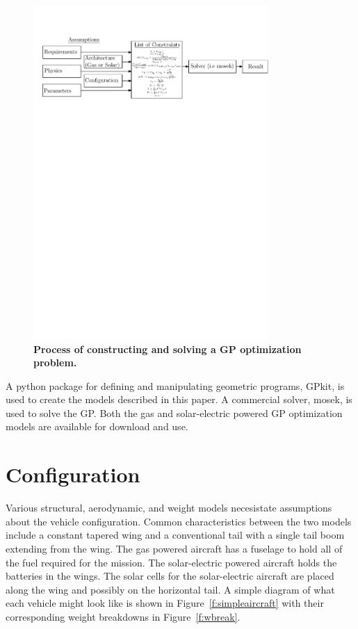 \begin{figure}[H]
	\begin{center}
	\includegraphics[width=0.8\textwidth,natwidth=480,natheight=200]{flowchart.pdf}
    \caption{\textbf{Process of constructing and solving a GP optimization problem. }}
	\label{f:flowchart}
	\end{center}
\end{figure}

A python package for defining and manipulating geometric programs, GPkit\cite{gpkitdocs}, is used to create the models described in this paper.  
A commercial solver, mosek\cite{mosek}, is used to solve the GP. 
Both the gas and solar-electric powered GP optimization models are available for download and use. \cite{gassolartrade} \\

\section{Configuration}

Various structural, aerodynamic, and weight models necesistate assumptions about the vehicle configuration.  
Common characteristics between the two models include a constant tapered wing and a conventional tail with a single tail boom extending from the wing.  
The gas powered aircraft has a fuselage to hold all of the fuel required for the mission.  
The solar-electric powered aircraft holds the batteries in the wings.  
The solar cells for the solar-electric aircraft are placed along the wing and possibly on the horizontal tail.  
A simple diagram of what each vehicle might look like is shown in Figure~\ref{f:simpleaircraft} with their corresponding weight breakdowns in Figure~\ref{f:wbreak}.


